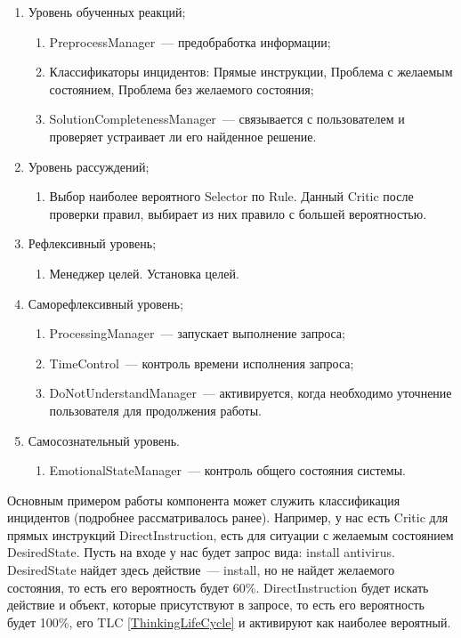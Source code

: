 \begin{enumerate}
	\item Уровень обученных реакций;
	\begin{enumerate}
		\item PreprocessManager~--- предобработка информации;
		\item Классификаторы инцидентов: Прямые инструкции, Проблема с желаемым состоянием, Проблема без желаемого состояния;
		\item SolutionCompletenessManager~--- связывается с пользователем и проверяет устраивает ли его найденное решение.
	\end{enumerate}
	\item Уровень рассуждений;
	\begin{enumerate}
		\item Выбор наиболее вероятного Selector по Rule. Данный Critic после проверки правил, выбирает из них правило с большей вероятностью.
	\end{enumerate}
	\item Рефлексивный уровень;
	\begin{enumerate}
		\item Менеджер целей. Установка целей.
	\end{enumerate}
	\item Саморефлексивный уровень;
	\begin{enumerate}
		\item ProcessingManager~--- запускает выполнение запроса;
		\item TimeControl~--- контроль времени исполнения запроса;
		\item DoNotUnderstandManager~--- активируется, когда необходимо уточнение пользователя для продолжения работы.
	\end{enumerate}
	\item Самосознательный уровень.
	\begin{enumerate}
		\item EmotionalStateManager~--- контроль общего состояния системы.
	\end{enumerate} 
\end{enumerate} \par
Основным примером работы компонента может служить классификация инцидентов (подробнее рассматривалось ранее). Например, у нас есть Critic для прямых инструкций DirectInstruction, есть для ситуации с желаемым состоянием DesiredState. Пусть на входе у нас будет запрос вида: install antivirus. DesiredState найдет здесь действие~--- install, но не найдет желаемого состояния, то есть его вероятность будет 60\%. DirectInstruction будет искать действие и объект, которые присутствуют в запросе, то есть его вероятность будет 100\%, его TLC \ref{ThinkingLifeCycle} и активируют как наиболее вероятный. \par
